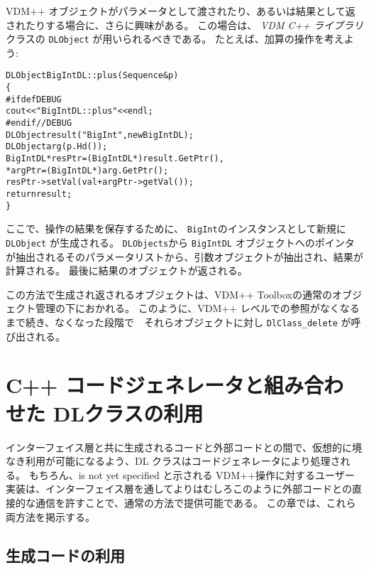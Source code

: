 \documentclass[\pformat,12pt]{jarticle}
\newcommand{\vdmcpplib}{\textit{VDM C++ ライブラリ}}
\begin{document}
 VDM++ オブジェクトがパラメータとして渡されたり、あるいは結果として返されたりする場合に、さらに興味がある。 
この場合は、 {\vdmcpplib}クラスの \texttt{DLObject} が用いられるべきである。
たとえば、加算の操作を考えよう:
\begin{alltt}
DLObject BigIntDL::plus (Sequence &p)
\{
\#ifdef DEBUG
  cout << "BigIntDL::plus" << endl;
\#endif //DEBUG
  DLObject result("BigInt", new BigIntDL);
  DLObject arg (p.Hd());
  BigIntDL *resPtr = (BigIntDL*) result.GetPtr(),
           *argPtr = (BigIntDL*) arg.GetPtr(); 
  resPtr->setVal( val + argPtr->getVal());
  return result;
\}
\end{alltt}
ここで、操作の結果を保存するために、 \texttt{BigInt}のインスタンスとして新規に \texttt{DLObject} が生成される。
 \texttt{DLObjects}から \texttt{BigIntDL} オブジェクトへのポインタが抽出されるそのパラメータリストから、引数オブジェクトが抽出され、結果が計算される。 
最後に結果のオブジェクトが返される。

この方法で生成され返されるオブジェクトは、VDM++ Toolboxの通常のオブジェクト管理の下におかれる。
このように、VDM++ レベルでの参照がなくなるまで続き、なくなった段階で　それらオブジェクトに対し \texttt{DlClass\_delete} が呼び出される。



\section{C++ コードジェネレータと組み合わせた DLクラスの利用}\label{sec:codegen}

インターフェイス層と共に生成されるコードと外部コードとの間で、仮想的に境なき利用が可能になるよう、DL クラスはコードジェネレータにより処理される。
もちろん、\textsf{is not yet specified} と示される VDM++操作に対するユーザー実装は、インターフェイス層を通してよりはむしろこのように外部コードとの直接的な通信を許すことで、通常の方法で提供可能である。
この章では、これら両方法を掲示する。

\subsection{生成コードの利用}
\end{document}
